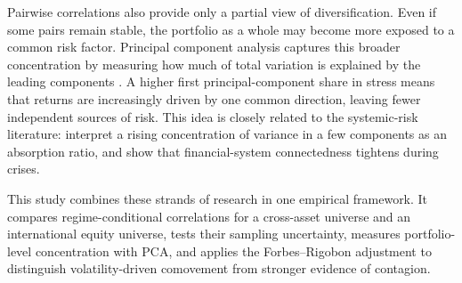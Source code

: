 Pairwise correlations also provide only a partial view of diversification. Even if some pairs
remain stable, the portfolio as a whole may become more exposed to a common risk factor.
Principal component analysis captures this broader concentration by measuring how much of
total variation is explained by the leading components \citep{jolliffe2002pca}. A higher first
principal-component share in stress means that returns are increasingly driven by one common
direction, leaving fewer independent sources of risk. This idea is closely related to the
systemic-risk literature: \citet{kritzman2011principal} interpret a rising concentration of
variance in a few components as an absorption ratio, and \citet{billio2012econometric} show that
financial-system connectedness tightens during crises.

This study combines these strands of research in one empirical framework. It compares
regime-conditional correlations for a cross-asset universe and an international equity universe,
tests their sampling uncertainty, measures portfolio-level concentration with PCA, and applies the Forbes--Rigobon
adjustment to distinguish volatility-driven comovement from stronger evidence of contagion.